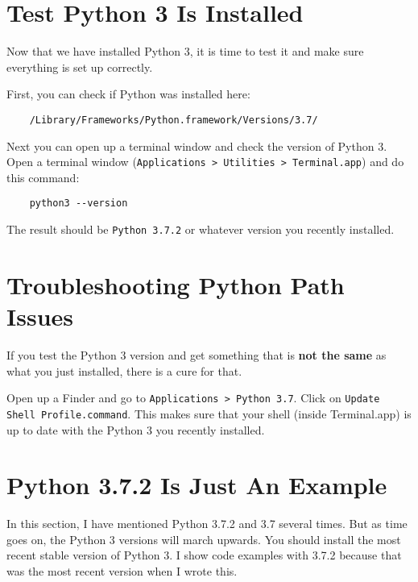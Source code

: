 \section{Test Python 3 Is Installed}

Now that we have installed Python 3, it is time to test it and
make sure everything is set up correctly.

First, you can check if Python was installed here:

\begin{verbatim}
    /Library/Frameworks/Python.framework/Versions/3.7/
\end{verbatim}

Next you can open up a terminal window and check the version
of Python 3. Open a terminal window (\verb=Applications > Utilities > Terminal.app=)
and do this command:

\begin{verbatim}
    python3 --version
\end{verbatim}

The result should be \verb=Python 3.7.2= or whatever version
you recently installed.

\section{Troubleshooting Python Path Issues}

If you test the Python 3 version and get something that is 
\textbf{not the same} as what you just installed, there is a cure for that.

Open up a Finder and go to \verb=Applications > Python 3.7=. Click
on \verb=Update Shell Profile.command=. This makes sure that your
shell (inside Terminal.app) is up to date with the Python 3 you
recently installed.

\section{Python 3.7.2 Is Just An Example}

In this section, I have mentioned Python 3.7.2 and 3.7 several times.
But as time goes on, the Python 3 versions will march upwards. You
should install the most recent stable version of Python 3. I show code
examples with 3.7.2 because that was the most recent version when I
wrote this.
